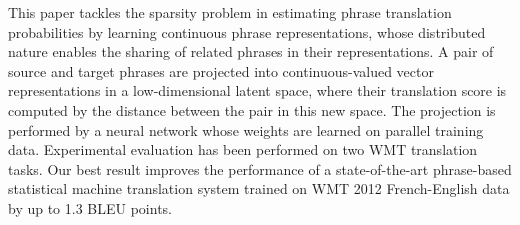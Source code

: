 This paper tackles the sparsity problem in estimating phrase translation probabilities by learning continuous phrase representations, whose distributed nature enables the sharing of related phrases in their representations. A pair of source and target phrases are projected into continuous-valued vector representations in a low-dimensional latent space, where their translation score is computed by the distance between the pair in this new space. The projection is performed by a neural network whose weights are learned on parallel training data. Experimental evaluation has been performed on two WMT translation tasks. Our best result improves the performance of a state-of-the-art phrase-based statistical machine translation system trained on WMT 2012 French-English data by up to 1.3 BLEU points.

